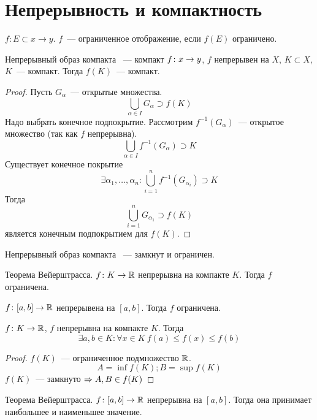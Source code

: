 ﻿\section{Непрерывность и компактность}

\begin{Def}
$f\colon E \subset x \to y$. $f$~--- ограниченное отображение, если $f(E)$ ограничено.
\end{Def}

\begin{theorem}{Непрерывный образ компакта ~--- компакт}
$f\colon x \rightarrow y$, $f$ непрерывен на $X$, $K \subset X$, $K$~--- компакт. Тогда $f(K)$~--- компакт.
\end{theorem}
\begin{proof}
Пусть $G_{\alpha}$~--- открытые множества.
$$\bigcup_{\alpha \in I} G_{\alpha} \supset f(K)$$ 
Надо выбрать конечное подпокрытие. Рассмотрим $f^{-1}(G_{\alpha})$~--- открытое множество (так как $f$ непрерывна).
$$\bigcup_{\alpha \in I} f^{-1}(G_{\alpha}) \supset K$$
Существует конечное покрытие
$$\exists \alpha_1, \ldots, \alpha_n\colon \bigcup_{i=1}^n f^{-1}(G_{\alpha_i}) \supset K$$
Тогда
$$\bigcup_{i=1}^n G_{\alpha_1} \supset f(K)$$ 
является конечным подпокрытием для $f(K)$.
\end{proof}


\begin{conseq}
Непрерывный образ компакта ~--- замкнут и ограничен.
\end{conseq}
\begin{conseq} Теорема Вейерштрасса.
$f\colon K \rightarrow \mathbb{R}$ непрерывна на компакте $K$. Тогда $f$ ограничена.
\end{conseq}
\begin{conseq}
$f\colon [a,b] \rightarrow \mathbb{R}$ непрерывена на $[a, b]$. Тогда $f$ ограничена.
\end{conseq}

\begin{conseq}
$f\colon K \to \mathbb{R}$, $f$ непрерывна на компакте $K$. Тогда
$$\exists a,b \in K\colon \forall x \in K\: f(a) \leqslant f(x) \leqslant f(b)$$
\end{conseq}
\begin{proof}
$f(K)$~--- ограниченное подмножество $\mathbb{R}$.
$$A = \inf f(K); B = \sup f(K)$$
$f(K)$~--- замкнуто $\Rightarrow A, B \in f(K)$
\end{proof} 
\begin{conseq} Теорема Вейерштрасса.
$f\colon [a, b] \rightarrow \mathbb{R}$ непрерывна на $[a, b]$. Тогда она принимает наибольшее и наименьшее значение.
\end{conseq}

